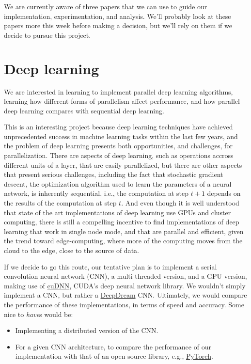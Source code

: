 \documentclass[11pt]{article} %
\begin{document}
We are currently aware of three papers \cite{Harris, Fomitchev, Maged} that we
can use to guide our implementation, experimentation, and analysis. We'll
probably look at these papers more this week before making a decision, but we'll
rely on them if we decide to pursue this project.

\section*{Deep learning}

We are interested in learning to implement parallel deep learning algorithms,
learning how different forms of parallelism affect performance, and how parallel
deep learning compares with sequential deep learning.

This is an interesting project because deep learning techniques have achieved
unprecedented success in machine learning tasks within the last few years, and
the problem of deep learning presents both opportunities, and challenges, for
parallelization. There are aspects of deep learning, such as operations accross
different units of a layer, that are easily parallelized, but there are other
aspects that present serious challenges, including the fact that stochastic
gradient descent, the optimization algorithm used to learn the parameters of a
neural network, is inherently sequential, i.e., the computation at step $t+1$
depends on the results of the computation at step $t$. And even though it is
well understood that state of the art implementations of deep learning use GPUs
and cluster computing, there is still a compelling incentive to find
implementations of deep learning that work in single node mode, and that are
parallel and efficient, given the trend toward edge-computing, where more of the
computing moves from the cloud to the edge, close to the source of data.

If we decide to go this route, our tentative plan is to implement a serial
convolution neural network (CNN), a multi-threaded version, and a GPU version,
making use of \href{https://developer.nvidia.com/cudnn}{cuDNN}, CUDA's deep
neural network library. We wouldn't simply implement a CNN, but rather a
\href{https://research.googleblog.com/2015/06/inceptionism-going-deeper-into-neural.html}
{DeepDream} CNN. Ultimately, we would compare the performance of these
implementations, in terms of speed and accuracy. Some nice to {\it have}s would
be:

\begin{itemize}
\item
Implementing a distributed version of the CNN.
\item
For a given CNN architecture, to compare the performance of our implementation
with that of an open source library, e.g., \href{http://pytorch.org/}{PyTorch}.
\end{itemize}
\end{document}
